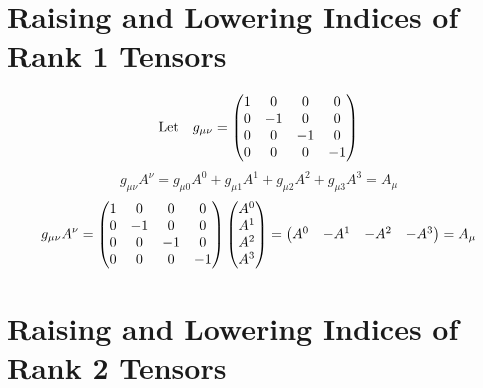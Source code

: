 \documentclass{article}
\begin{document}
\section*{Raising and Lowering Indices of Rank 1 Tensors}
\[\qq*{Let}g_{\mu\nu}=\pmqty{1&0&0&0\\0&-1&0&0\\0&0&-1&0\\0&0&0&-1\\} \]
\[g_{\mu\nu}A^\nu=g_{\mu0}A^0+g_{\mu1}A^1+g_{\mu2}A^2+g_{\mu3}A^3=A_\mu \]
\[g_{\mu\nu}A^\nu=\pmqty{1&0&0&0\\0&-1&0&0\\0&0&-1&0\\0&0&0&-1\\}\pmqty{A^0\\A^1\\A^2\\A^3\\}=\pmqty{A^0&-A^1&-A^2&-A^3\\}=A_\mu \]

\section*{Raising and Lowering Indices of Rank 2 Tensors}
\end{document}
